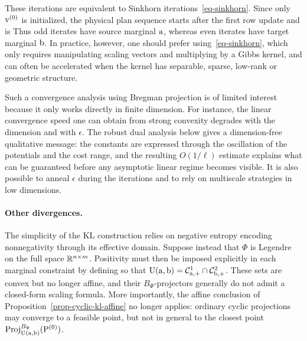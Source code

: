 These iterations are equivalent to Sinkhorn iterations~\eqref{eq-sinkhorn}. Since only $\mathrm{v}^{(0)}$ is initialized, the physical plan sequence starts after the first row update and is
Thus odd iterates have source marginal $\mathrm{a}$, whereas even iterates have target marginal $\mathrm{b}$.
In practice, however, one should prefer using~\eqref{eq-sinkhorn}, which only requires manipulating scaling vectors and multiplying by a Gibbs kernel, and can often be accelerated when the kernel has separable, sparse, low-rank or geometric structure.

Such a convergence analysis using Bregman projection is of limited interest because it only works directly in finite dimension. For instance, the linear convergence speed one can obtain from strong convexity degrades with the dimension and with $\epsilon$. The robust dual analysis below gives a dimension-free qualitative message: the constants are expressed through the oscillation of the potentials and the cost range, and the resulting $O(1/\ell)$ estimate explains what can be guaranteed before any asymptotic linear regime becomes visible.
%
It is also possible to anneal $\epsilon$ during the iterations and to rely on multiscale strategies in low dimensions.

\paragraph{Other divergences.}

The simplicity of the KL construction relies on negative entropy encoding nonnegativity through its effective domain. Suppose instead that $\Phi$ is Legendre on the full space $\mathbb{R}^{n\times m}$. Positivity must then be imposed explicitly in each marginal constraint by defining
so that $\mathrm{U}(\mathrm{a},\mathrm{b})=\mathcal{C}^1_{\mathrm{a},+}\cap\mathcal{C}^2_{\mathrm{b},+}$. These sets are convex but no longer affine, and their $B_\Phi$-projectors generally do not admit a closed-form scaling formula. More importantly, the affine conclusion of Proposition~\ref{prop-cyclic-kl-affine} no longer applies: ordinary cyclic projections may converge to a feasible point, but not in general to the closest point $\operatorname{Proj}_{\mathrm{U}(\mathrm{a},\mathrm{b})}^{B_\Phi}(\mathrm{P}^{(0)})$.

